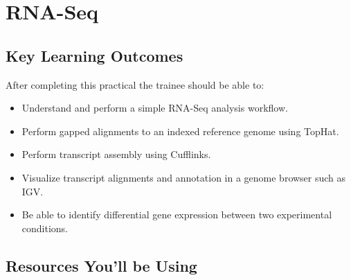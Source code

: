 \renewcommand{\moduleTitle}{RNA-Seq}
\renewcommand{\moduleAuthors}{%
  Myrto Kostadima, EMBL-EBI \mailto{kostadmi@ebi.ac.uk}\\
  Remco Loos, EMBL-EBI \mailto{remco@ebi.ac.uk}
} \renewcommand{\moduleContributions}{%
  Nathan S. Watson-Haigh \mailto{nathan.watson-haigh@awri.com.au}%
}

\chapter{\moduleTitle}
\newpage

\section{Key Learning Outcomes}

After completing this practical the trainee should be able to:
\begin{itemize}
  \item Understand and perform a simple RNA-Seq analysis workflow.
  \item Perform gapped alignments to an indexed reference genome using TopHat.
  \item Perform transcript assembly using Cufflinks.
  \item Visualize transcript alignments and annotation in a genome browser such as IGV.
  \item Be able to identify differential gene expression between two experimental conditions.
\end{itemize}

\section{Resources You'll be Using}
 
